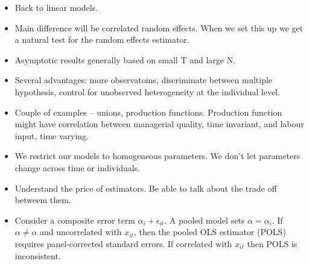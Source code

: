 \documentclass[12pt]{article}
\begin{document}
\begin{itemize}
      \item Back to linear models.
      \item Main difference will be correlated random effects.
            When we set this up we get a natural test for the random effects estimator.
      \item Asymptotic results generally based on small T and large N.
      \item Several advantages: more observatoins, discriminate between multiple hypothesis, control for unobserved heterogeneity at the individual level.
      \item Couple of examples -- unions, production functions.
            Production function might have correlation between managerial quality, time invariant, and labour input, time varying.
      \item We restrict our models to homogeneous parameters. We don't let parameters change across time or individuals.
      \item Understand the price of estimators. Be able to talk about the trade off betweem them.
      \item Consider a composite error term $ \alpha_i + \epsilon_{it}$. A pooled model sets $\alpha = \alpha_i$.
            If $\alpha \neq \alpha$ and uncorrelated with $x_{it}$, then the pooled OLS estimator (POLS) requires panel-corrected standard errors. If correlated with $x_{it}$ then POLS is inconsistent.


\end{itemize}
\end{document}
